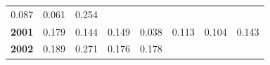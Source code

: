 \documentclass[]{article}
\begin{document}
\begin{longtable}[]{@{}rrrrrrrr@{}}
\begin{minipage}[t]{0.09\columnwidth}
0.087\strut
\end{minipage} & \begin{minipage}[t]{0.08\columnwidth}\raggedleft\strut
0.061\strut
\end{minipage} & \begin{minipage}[t]{0.10\columnwidth}\raggedleft\strut
0.254\strut
\end{minipage}\tabularnewline
\begin{minipage}[t]{0.08\columnwidth}\raggedleft\strut
\textbf{2001}\strut
\end{minipage} & \begin{minipage}[t]{0.10\columnwidth}\raggedleft\strut
0.179\strut
\end{minipage} & \begin{minipage}[t]{0.11\columnwidth}\raggedleft\strut
0.144\strut
\end{minipage} & \begin{minipage}[t]{0.08\columnwidth}\raggedleft\strut
0.149\strut
\end{minipage} & \begin{minipage}[t]{0.14\columnwidth}\raggedleft\strut
0.038\strut
\end{minipage} & \begin{minipage}[t]{0.09\columnwidth}\raggedleft\strut
0.113\strut
\end{minipage} & \begin{minipage}[t]{0.08\columnwidth}\raggedleft\strut
0.104\strut
\end{minipage} & \begin{minipage}[t]{0.10\columnwidth}\raggedleft\strut
0.143\strut
\end{minipage}\tabularnewline
\begin{minipage}[t]{0.08\columnwidth}\raggedleft\strut
\textbf{2002}\strut
\end{minipage} & \begin{minipage}[t]{0.10\columnwidth}\raggedleft\strut
0.189\strut
\end{minipage} & \begin{minipage}[t]{0.11\columnwidth}\raggedleft\strut
0.271\strut
\end{minipage} & \begin{minipage}[t]{0.08\columnwidth}\raggedleft\strut
0.176\strut
\end{minipage} & \begin{minipage}[t]{0.14\columnwidth}\raggedleft\strut
0.178\strut
\end{minipage} & \begin{minipage}[t]{0.09\columnwidth}\raggedleft\strut

\end{minipage}
\end{longtable}
\end{document}
